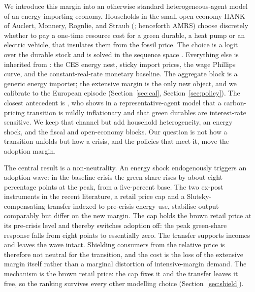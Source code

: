 We introduce this margin into an otherwise standard heterogeneous-agent model of
an energy-importing economy. Households in the small open economy HANK of
Auclert, Monnery, Rognlie, and Straub (\citeyear{auclert2023energy}; henceforth AMRS)
choose discretely whether to pay a one-time resource cost for a green durable, a
heat pump or an electric vehicle, that insulates them from the fossil price. The
choice is a logit over the durable stock and is solved in the sequence space
\citep{Auclert2021a}.
Everything else is inherited from \citet{auclert2023energy}: the CES energy nest, sticky
import prices, the wage Phillips curve, and the constant-real-rate monetary
baseline. The aggregate block is a generic energy importer; the extensive margin
is the only new object, and we calibrate to the European episode
(Section~\ref{sec:cal}, Section~\ref{sec:policy}). The closest
antecedent is \citet{dietrich2025consumer}, who shows in a representative-agent model
that a carbon-pricing transition is mildly inflationary and that green durables
are interest-rate sensitive. We keep that channel but add household
heterogeneity, an energy shock, and the fiscal and open-economy blocks. Our
question is not how a transition unfolds but how a crisis, and the policies that
meet it, move the adoption margin.

The central result is a non-neutrality. An energy shock endogenously triggers an
adoption wave: in the baseline crisis the green share rises by about eight
percentage points at the peak, from a five-percent base. The two ex-post
instruments in the recent literature, a retail price cap and a
Slutsky-compensating transfer indexed to pre-crisis energy use, stabilise output
comparably but differ on the new margin. The cap holds the brown retail price at
its pre-crisis level and thereby switches adoption off: the peak green-share
response falls from eight points to essentially zero. The transfer supports
incomes and leaves the wave intact. Shielding consumers from the relative price
is therefore not neutral for the transition, and the cost is the loss of the
extensive margin itself rather than a marginal distortion of intensive-margin
demand. The mechanism is the brown retail price: the cap fixes it and the
transfer leaves it free, so the ranking survives every other modelling choice
(Section~\ref{sec:shield}).

